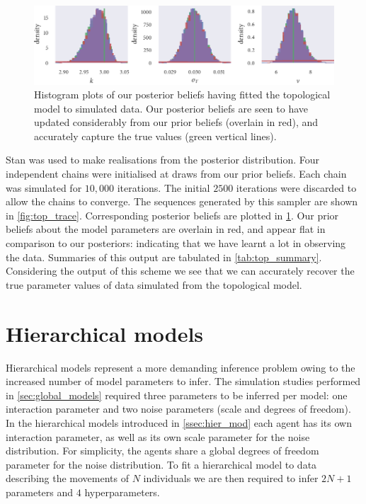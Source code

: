 \begin{figure}[tbp]
  \includegraphics{top_hist.pdf}
  \caption{Histogram plots of our posterior beliefs having fitted the
    topological model to simulated data. Our posterior beliefs are seen to have
    updated considerably from our prior beliefs (overlain in red), and accurately
    capture the true values (green vertical lines).}
  \label{fig:top_hist}
\end{figure}

Stan was used to make realisations from the posterior distribution. Four
independent chains were initialised at draws from our prior beliefs. Each chain
was simulated for $10,000$ iterations. The initial $2500$ iterations were
discarded to allow the chains to converge. The sequences generated by this
sampler are shown in \cref{fig:top_trace}. Corresponding posterior beliefs are
plotted in \cref{fig:top_hist}. Our prior beliefs about the model parameters
are overlain in red, and appear flat in comparison to our posteriors:
indicating that we have learnt a lot in observing the data. Summaries of this
output are tabulated in \cref{tab:top_summary}. Considering the output of this
scheme we see that we can accurately recover the true parameter values of data
simulated from the topological model.

\section{Hierarchical models}

Hierarchical models represent a more demanding inference problem owing to the
increased number of model parameters to infer. The simulation studies performed
in \cref{sec:global_models} required three parameters to be inferred per model:
one interaction parameter and two noise parameters (scale and degrees of
freedom). In the hierarchical models introduced in \cref{ssec:hier_mod} each
agent has its own interaction parameter, as well as its own scale parameter for
the noise distribution. For simplicity, the agents share a global degrees of
freedom parameter for the noise distribution. To fit a hierarchical model to
data describing the movements of $N$ individuals we are then required to infer
$2N+1$ parameters and $4$ hyperparameters.

